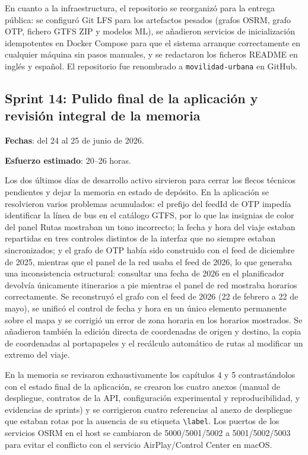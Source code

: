 En cuanto a la infraestructura, el repositorio se reorganizó para la entrega pública: se configuró Git LFS para los artefactos pesados (grafos OSRM, grafo OTP, fichero GTFS ZIP y modelos ML), se añadieron servicios de inicialización idempotentes en Docker Compose para que el sistema arranque correctamente en cualquier máquina sin pasos manuales, y se redactaron los ficheros README en inglés y español. El repositorio fue renombrado a \texttt{movilidad-urbana} en GitHub.

\subsection{Sprint 14: Pulido final de la aplicación y revisión integral de la memoria}

\textbf{Fechas}: del 24 al 25 de junio de 2026.

\textbf{Esfuerzo estimado}: 20--26 horas.

Los dos últimos días de desarrollo activo sirvieron para cerrar los flecos técnicos pendientes y dejar la memoria en estado de depósito. En la aplicación se resolvieron varios problemas acumulados: el prefijo del feedId de OTP impedía identificar la línea de bus en el catálogo GTFS, por lo que las insignias de color del panel Rutas mostraban un tono incorrecto; la fecha y hora del viaje estaban repartidas en tres controles distintos de la interfaz que no siempre estaban sincronizados; y el grafo de OTP había sido construido con el feed de diciembre de 2025, mientras que el panel de la red usaba el feed de 2026, lo que generaba una inconsistencia estructural: consultar una fecha de 2026 en el planificador devolvía únicamente itinerarios a pie mientras el panel de red mostraba horarios correctamente. Se reconstruyó el grafo con el feed de 2026 (22 de febrero a 22 de mayo), se unificó el control de fecha y hora en un único elemento permanente sobre el mapa y se corrigió un error de zona horaria en los horarios mostrados. Se añadieron también la edición directa de coordenadas de origen y destino, la copia de coordenadas al portapapeles y el recálculo automático de rutas al modificar un extremo del viaje.

En la memoria se revisaron exhaustivamente los capítulos 4 y 5 contrastándolos con el estado final de la aplicación, se crearon los cuatro anexos (manual de despliegue, contratos de la API, configuración experimental y reproducibilidad, y evidencias de sprints) y se corrigieron cuatro referencias al anexo de despliegue que estaban rotas por la ausencia de su etiqueta \texttt{\textbackslash label}. Los puertos de los servicios OSRM en el host se cambiaron de 5000/5001/5002 a 5001/5002/5003 para evitar el conflicto con el servicio AirPlay/Control Center en macOS.


